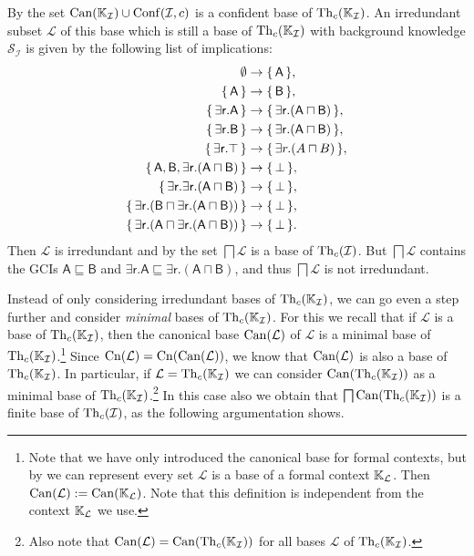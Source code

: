 \begin{Example}
  By  the set $\operatorname{Can}({\mathbb{K}}_{\mathcal{I}}) \cup \operatorname{Conf}(\mathcal{I}, c)$
  is a confident base of $\operatorname{Th}_c({\mathbb{K}}_{\mathcal{I}})$.  An irredundant subset
  $\mathcal{L}$ of this base which is still a base of $\operatorname{Th}_c({\mathbb{K}}_{\mathcal{I}})$ with
  background knowledge $\mathcal{S}_{\mathcal{I}}$ is given by the following list of
  implications:
  \begin{align*}
    \emptyset &\to {\ensuremath{\{\,\sf A\,\}}},\\
    {\{\,\sf A\,\}}    &\to {\ensuremath{\{\,\sf B\,\}}},\\
    {\{\,\sf \exists r.A\,\}} &\to {\ensuremath{\{\,\sf \exists r.(A \sqcap B)\,\}}},\\
    {\{\,\sf \exists r.B\,\}} &\to {\ensuremath{\{\,\sf \exists r.(A \sqcap B)\,\}}},\\
    {\{\,\sf \exists r.\top\,\}} &\to {\ensuremath{\{\,\exists r.(A \sqcap B)\,\}}},\\
    {\{\,\sf A, B, \exists r.(A \sqcap B)\,\}} &\to {\ensuremath{\{\,\bot\,\}}},\\
    {\{\,\sf \exists r.\exists r.(A \sqcap B)\,\}} &\to {\ensuremath{\{\,\bot\,\}}},\\
    {\{\,\sf \exists r.(B \sqcap \exists r.(A \sqcap B))\,\}} &\to {\ensuremath{\{\,\bot\,\}}},\\
    {\{\,\sf \exists r.(A \sqcap \exists r.(A \sqcap B))\,\}} &\to {\ensuremath{\{\,\bot\,\}}}.
  \end{align*}
  Then $\mathcal{L}$ is irredundant and by
   the set $\bigsqcap
  \mathcal{L}$ is a base of $\operatorname{Th}_c(\mathcal{I})$.  But $\bigsqcap \mathcal{L}$ contains
  the GCIs $\mathsf{A \sqsubseteq B}$ and $\mathsf{\exists r. A \sqsubseteq \exists r. (A
    \sqcap B)}$, and thus $\bigsqcap \mathcal{L}$ is not irredundant.
\end{Example}

Instead of only considering irredundant bases of $\operatorname{Th}_c({\mathbb{K}}_{\mathcal{I}})$, we can go
even a step further and consider \emph{minimal} bases of $\operatorname{Th}_c({\mathbb{K}}_{\mathcal{I}})$.
For this we recall that if $\mathcal{L}$ is a base of $\operatorname{Th}_c({\mathbb{K}}_{\mathcal{I}})$, then
the canonical base $\operatorname{Can}(\mathcal{L})$ of $\mathcal{L}$ is a minimal base of $\operatorname{Th}_c({\mathbb{K}}_{\mathcal{I}})$.\footnote{Note that we have only introduced the canonical base for
  formal contexts, but by  we can represent
  every set $\mathcal{L}$ is a base of a formal context ${\mathbb{K}}_{\mathcal{L}}$.  Then
  $\operatorname{Can}(\mathcal{L}) := \operatorname{Can}({\mathbb{K}}_{\mathcal{L}})$.  Note that this definition is
  independent from the context ${\mathbb{K}}_{\mathcal{L}}$ we use.}  Since $\operatorname{Cn}(\mathcal{L}) =
\operatorname{Cn}(\operatorname{Can}(\mathcal{L}))$, we know that $\operatorname{Can}(\mathcal{L})$ is also a base of $\operatorname{Th}_c({\mathbb{K}}_{\mathcal{I}})$.  In particular, if $\mathcal{L} = \operatorname{Th}_c({\mathbb{K}}_{\mathcal{I}})$ we can
consider $\operatorname{Can}(\operatorname{Th}_c({\mathbb{K}}_{\mathcal{I}}))$ as a minimal base of $\operatorname{Th}_c({\mathbb{K}}_{\mathcal{I}})$.\footnote{Also note that $\operatorname{Can}(\mathcal{L}) = \operatorname{Can}(\operatorname{Th}_c({\mathbb{K}}_{\mathcal{I}}))$ for all bases $\mathcal{L}$ of $\operatorname{Th}_c({\mathbb{K}}_{\mathcal{I}})$.}  In
this case also we obtain that $\bigsqcap \operatorname{Can}(\operatorname{Th}_c({\mathbb{K}}_{\mathcal{I}}))$ is a finite
base of $\operatorname{Th}_c(\mathcal{I})$, as the following argumentation shows.

